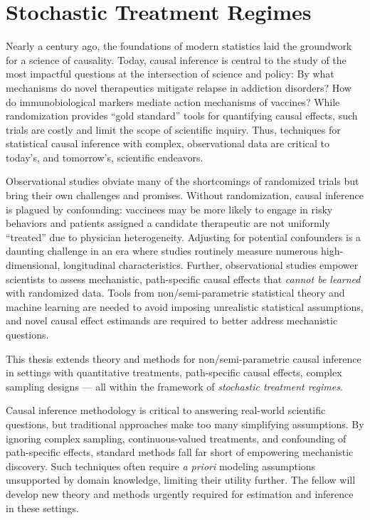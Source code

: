 \chapter{Stochastic Treatment Regimes}

Nearly a century ago, the foundations of modern statistics laid the groundwork
for a science of causality.
Today, causal inference is central to the study of the most impactful questions
at the intersection of science and policy: By what mechanisms do novel
therapeutics mitigate relapse in addiction disorders? How do immunobiological
markers mediate action mechanisms of vaccines? While randomization provides
``gold standard'' tools for quantifying causal effects, such trials are costly
and limit the scope of scientific inquiry. Thus, techniques for statistical
causal inference with complex, observational data are critical to today's, and
tomorrow's, scientific endeavors.

Observational studies obviate many of the shortcomings of randomized trials but
bring their own challenges and promises.
Without randomization, causal inference is plagued by confounding: vaccinees may
be more likely to engage in risky behaviors and patients assigned a candidate
therapeutic are not uniformly ``treated'' due to physician heterogeneity.
Adjusting for potential confounders is a daunting challenge in an era where
studies routinely measure numerous high-dimensional, longitudinal
characteristics. Further, observational studies empower scientists to assess
mechanistic, path-specific causal effects that \textit{cannot be learned} with
randomized data. Tools from non/semi-parametric statistical theory and machine
learning are needed to avoid imposing unrealistic statistical assumptions, and
novel causal effect estimands are required to better address mechanistic
questions.

This thesis extends theory and methods for
non/semi-parametric causal inference in settings with quantitative treatments,
path-specific causal effects, complex sampling designs --- all within the
framework of \textit{stochastic treatment regimes}.

Causal inference methodology is critical to answering real-world scientific
questions, but traditional approaches make too many simplifying assumptions. By
ignoring complex sampling, continuous-valued treatments, and confounding of
path-specific effects, standard methods fall far short of empowering mechanistic
discovery. Such techniques often require \textit{a priori} modeling assumptions
unsupported by domain knowledge, limiting their utility further. The fellow will
develop new theory and methods urgently required for estimation and inference in
these settings.

